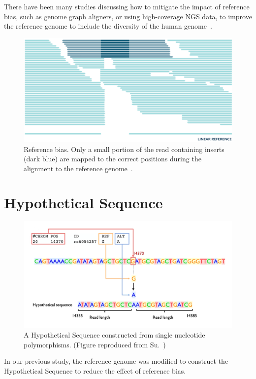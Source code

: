 \documentclass[PhD]{PHlab-thesis}
\begin{document}
There have been many studies discussing how to mitigate the impact of reference bias, such as genome graph aligners, or using high-coverage NGS data, to improve the reference genome to include the diversity of the human genome~\cite{Günther2019Refbias, Chen2021Refbias}.

\begin{figure}[h!]
	\centering
	\includegraphics[scale=0.25]{figures/Reference bias.png}
	\caption{Reference bias. Only a small portion of the read containing inserts (dark blue) are mapped to the correct positions during the alignment to the reference genome~\cite{Lau2017Refbias}.}
	\label{fig:Reference bias} %
\end{figure}

\section{Hypothetical Sequence}
\begin{figure}[h!]
	\centering
	\includegraphics[scale=0.25]{figures/Hypothetical Sequence.png}
	\caption{A Hypothetical Sequence constructed from single nucleotide polymorphisms. (Figure reproduced from Su.~\cite{Su2021RI})}
	\label{fig:Hypothetical Sequence} %
\end{figure}
In our previous study, the reference genome was modified to construct the Hypothetical Sequence to reduce the effect of reference bias.
\end{document}
